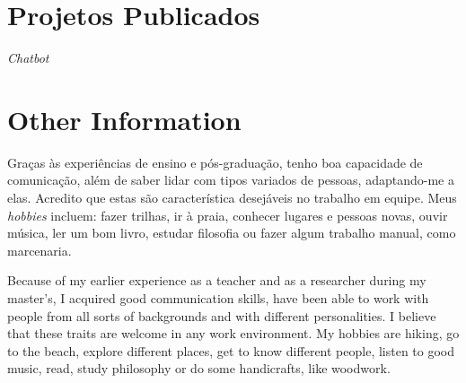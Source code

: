 \documentclass[letterpaper]{twentysecondcv} %
\begin{document}
\section{Projetos Publicados}
\vspace{-0.15cm}
\begin{twentyshort} %


	 \textit{Chatbot} 
	
	
	

\end{twentyshort}
\vspace{0.3cm}

\section{Other Information}
\vspace{-0.2cm}
\begin{adjustwidth}{0.5em}{0.0em}
	Graças às experiências de ensino e pós-graduação, tenho boa capacidade
	de comunicação, além de saber lidar com tipos variados de pessoas,
	adaptando-me a elas. Acredito que estas são característica desejáveis no
	trabalho em equipe. Meus \textit{hobbies} incluem: fazer trilhas, ir à
	praia, conhecer lugares e pessoas novas, ouvir música, ler um bom livro,
	estudar filosofia ou fazer algum trabalho manual, como marcenaria.

	Because of my earlier experience as a teacher and as a researcher during my master's, 
	I acquired good communication skills, have been able to work with people from all sorts of 
	backgrounds and with different personalities.  I believe that these traits are welcome in any 
	work environment. My hobbies are hiking, go to the beach, explore different places, get to know 
	different people, listen to good music, read, study philosophy or do some handicrafts, like woodwork.

\end{adjustwidth}
\end{document}
